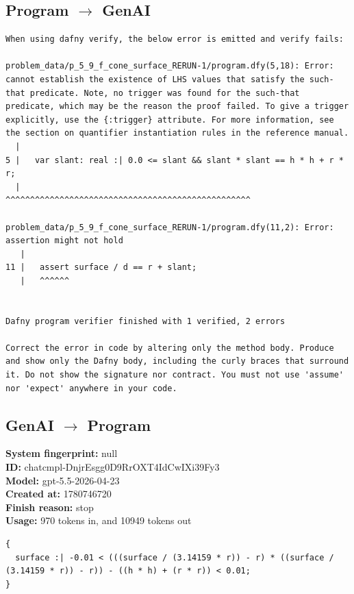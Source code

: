 \documentclass{article}
\begin{document}
\subsection*{Program $\rightarrow$ GenAI}
\begin{lstlisting}
When using dafny verify, the below error is emitted and verify fails:

problem_data/p_5_9_f_cone_surface_RERUN-1/program.dfy(5,18): Error: cannot establish the existence of LHS values that satisfy the such-that predicate. Note, no trigger was found for the such-that predicate, which may be the reason the proof failed. To give a trigger explicitly, use the {:trigger} attribute. For more information, see the section on quantifier instantiation rules in the reference manual.
  |
5 |   var slant: real :| 0.0 <= slant && slant * slant == h * h + r * r;
  |                   ^^^^^^^^^^^^^^^^^^^^^^^^^^^^^^^^^^^^^^^^^^^^^^^^^^

problem_data/p_5_9_f_cone_surface_RERUN-1/program.dfy(11,2): Error: assertion might not hold
   |
11 |   assert surface / d == r + slant;
   |   ^^^^^^


Dafny program verifier finished with 1 verified, 2 errors

Correct the error in code by altering only the method body. Produce and show only the Dafny body, including the curly braces that surround it. Do not show the signature nor contract. You must not use 'assume' nor 'expect' anywhere in your code.
\end{lstlisting}
\subsection*{GenAI $\rightarrow$ Program}
\textbf{System fingerprint: }null
\\\textbf{ID: }chatcmpl-DnjrEsgg0D9RrOXT4IdCwIXi39Fy3
\\\textbf{Model: }gpt-5.5-2026-04-23
\\\textbf{Created at: }1780746720
\\\textbf{Finish reason: }stop
\\\textbf{Usage: }970 tokens in, and 10949 tokens out
\begin{lstlisting}
{
  surface :| -0.01 < (((surface / (3.14159 * r)) - r) * ((surface / (3.14159 * r)) - r)) - ((h * h) + (r * r)) < 0.01;
}
\end{lstlisting}
\end{document}
